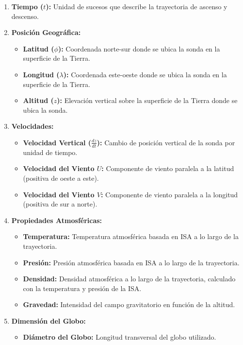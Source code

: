 \begin{enumerate}
    \item \textbf{Tiempo (\(t\)):} Unidad de sucesos que describe la trayectoria de ascenso y descenso.
    
    \item \textbf{Posición Geográfica:}
    \begin{itemize}
        \item \textbf{Latitud (\(\phi\)):} Coordenada norte-sur donde se ubica la sonda en la superficie de la Tierra.
        \item \textbf{Longitud (\(\lambda\)):} Coordenada este-oeste donde se ubica la sonda en la superficie de la Tierra.
        \item \textbf{Altitud (\(z\)):} Elevación vertical sobre la superficie de la Tierra donde se ubica la sonda.
    \end{itemize}
    
    \item \textbf{Velocidades:}
    \begin{itemize}
        \item \textbf{Velocidad Vertical (\(\frac{dz}{dt}\)):} Cambio de posición vertical de la sonda por unidad de tiempo.
        \item \textbf{Velocidad del Viento \(U\):} Componente de viento paralela a la latitud (positiva de oeste a este).
        \item \textbf{Velocidad del Viento \(V\):} Componente de viento paralela a la longitud (positiva de sur a norte).
    \end{itemize}
    
    \item \textbf{Propiedades Atmosféricas:}
    \begin{itemize}
        \item \textbf{Temperatura:} Temperatura atmosférica basada en ISA a lo largo de la trayectoria.
        \item \textbf{Presión:} Presión atmosférica basada en ISA a lo largo de la trayectoria.
        \item \textbf{Densidad:} Densidad atmosférica a lo largo de la trayectoria, calculado con la temperatura y presión de la ISA.
        \item \textbf{Gravedad:} Intensidad del campo gravitatorio en función de la altitud.
    \end{itemize}
    
    \item \textbf{Dimensión del Globo:}
    \begin{itemize}
        \item \textbf{Diámetro del Globo:} Longitud transversal del globo utilizado.
    \end{itemize}
\end{enumerate}

